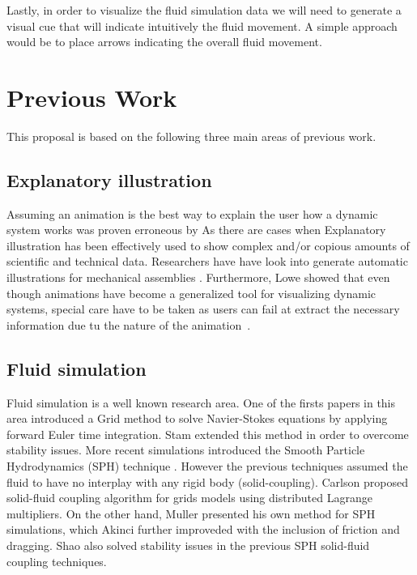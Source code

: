 \documentclass[11pt]{report}
\begin{document}
Lastly, in order to visualize the fluid simulation data we will need to generate a visual cue that will indicate intuitively the fluid movement.
A simple approach would be to place arrows indicating the overall fluid movement.

\section{Previous Work}

This proposal is based on the following three main areas of previous work.

\subsection{Explanatory illustration}

Assuming an animation is the best way to explain the user how a dynamic system works was proven erroneous by
As there are cases when 
Explanatory illustration has been effectively used to show complex and/or copious amounts of  scientific and technical data.
Researchers have have look into generate automatic illustrations for mechanical assemblies \cite{Mitra2010}.
Furthermore, Lowe showed that even though animations have become a generalized tool for visualizing dynamic systems, special care have to be taken as users can fail at extract the necessary information due tu the nature of the animation~\cite{Lowe2014}.


\subsection{Fluid simulation}

Fluid simulation is a well known research area. 
One of the firsts papers in this area introduced a Grid method \cite{Foster1996} to solve Navier-Stokes equations by applying forward Euler time integration. 
Stam \cite{Stam1999} extended this method in order to overcome stability issues.
More recent simulations introduced the Smooth Particle Hydrodynamics (SPH) technique \cite{DesbrunMathieuandGascuel1996}.
However the previous techniques assumed the fluid to have no interplay with any rigid body (solid-coupling).
Carlson \cite{Carlson2004} proposed solid-fluid coupling algorithm for grids models using distributed Lagrange multipliers.
On the other hand, Muller \cite{Muller2004} presented his own method for SPH simulations, which Akinci \cite{Akinci2012} further improveded with the inclusion of friction and dragging. 
Shao \cite{Shao2014} also solved stability issues in the previous SPH solid-fluid coupling techniques.
\end{document}
